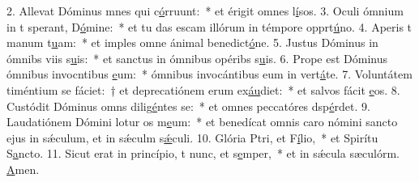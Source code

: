 2. Allevat Dóminus mnes qui c\uline{ó}rruunt:~* et érigit omnes l\uline{í}sos.
3. Oculi ómnium in t sperant, D\uline{ó}mine:~* et tu das escam illórum in témpore opprt\uline{ú}no.
4. Aperis t manum t\uline{u}am:~* et imples omne ánimal benedict\uline{ó}ne.
5. Justus Dóminus in ómnibs viis s\uline{u}is:~* et sanctus in ómnibus opéribs s\uline{u}is.
6. Prope est Dóminus ómnibus invocntibus \uline{e}um:~* ómnibus invocántibus eum in vert\uline{á}te.
7. Voluntátem timéntium se fáciet:~† et deprecatiónem erum ex\uline{áu}diet:~* et salvos fácit \uline{e}os.
8. Custódit Dóminus omns dilig\uline{é}ntes se:~* et omnes peccatóres dsp\uline{é}rdet.
9. Laudatiónem Dómini lotur os m\uline{e}um:~* et benedícat omnis caro nómini sancto ejus in sǽculum, et in sǽculm s\uline{ǽ}culi.
10. Glória Ptri, et F\uline{í}lio,~* et Spirítu S\uline{a}ncto.
11. Sicut erat in princípio, t nunc, et s\uline{e}mper,~* et in sǽcula sæculórm. \uline{A}men.
